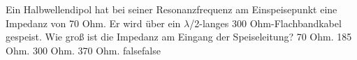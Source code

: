     {Ein Halbwellendipol hat bei seiner Resonanzfrequenz am Einspeisepunkt eine Impedanz von 70 Ohm. Er wird über ein $\lambda$/2-langes 300 Ohm-Flachbandkabel gespeist. Wie groß ist die Impedanz am Eingang der Speiseleitung?}
    {70 Ohm.}
    {185 Ohm.}
    {300 Ohm.}
    {370 Ohm.}
    {false}{false}